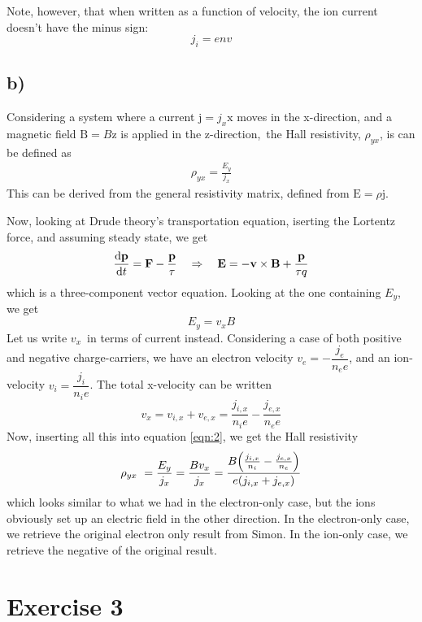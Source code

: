 \documentclass[12p,a4paper]{article}
\renewcommand{\b}[1]{\boldsymbol{\mathrm{#1}}}
\begin{document}
Note, however, that when written as a function of velocity, the ion current doesn't have the minus sign:
\[
    j_i = env
\]


\subsection*{b)}
Considering a system where a current $\b j = j_x \b x$ moves in the x-direction, and a magnetic field $\b B = B \b z$ is applied in the z-direction, the Hall resistivity, $\rho_{yx}$, is can be defined as
\begin{align}\label{eqn:2}
    \rho_{yx} = \frac{E_y}{j_x}
\end{align}
This can be derived from the general resistivity matrix, defined from $\b E = \rho \b j$.

Now, looking at Drude theory's transportation equation, iserting the Lortentz force, and assuming steady state, we get
\[
    \dv{\b p}{t} = \b F - \frac{\b p}{\tau} \quad\Rightarrow\quad \b E = - \b v \times \b B + \frac{\b p}{\tau q}
\]
which is a three-component vector equation. Looking at the one containing $E_y$, we get
\[
    E_y = v_x B
\]
Let us write $v_x$ in terms of current instead. Considering a case of both positive and negative charge-carriers, we have an electron velocity $v_e = -\dfrac{j_e}{n_e e}$, and an ion-velocity $v_i = \dfrac{j_i}{n_i e}$. The total x-velocity can be written
\[
    v_x = v_{i,x} + v_{e,x} = \frac{j_{i,x}}{n_ie} - \frac{j_{e,x}}{n_e e}
\]
Now, inserting all this into equation \ref{eqn:2}, we get the Hall resistivity
\[
    \rho_{yx} = \frac{E_y}{j_x} = \frac{B v_x}{j_x} = \dfrac{B\qty(\frac{j_{i,x}}{n_i} - \frac{j_{e,x}}{n_e})}{e\qty(j_{i,x} + j_{e,x})}
\]
which looks similar to what we had in the electron-only case, but the ions obviously set up an electric field in the other direction. In the electron-only case, we retrieve the original electron only result from Simon. In the ion-only case, we retrieve the negative of the original result.


\section*{Exercise 3}
\end{document}
